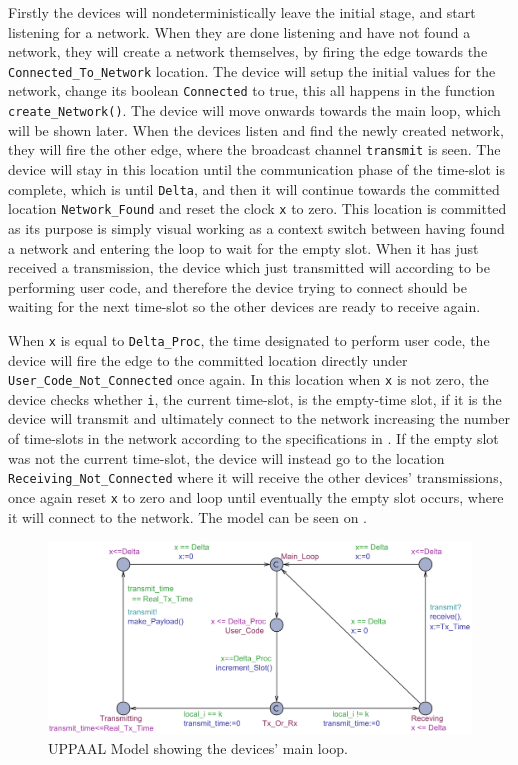 \newpage
\noindent
Firstly the devices will nondeterministically leave the initial stage, and start listening for a network.
When they are done listening and have not found a network, they will create a network themselves, by firing the edge towards the \texttt{Connected\_To\_Network} location.
The device will setup the initial values for the network, change its boolean \texttt{Connected} to true, this all happens in the function \texttt{create\_Network()}. 
The device will move onwards towards the main loop, which will be shown later.
When the devices listen and find the newly created network, they will fire the other edge, where the broadcast channel \texttt{transmit} is seen.
The device will stay in this location until the communication phase of the time-slot is complete, which is until \texttt{Delta}, and then it will continue towards the committed location \texttt{Network\_Found} and reset the clock \texttt{x} to zero.
This location is committed as its purpose is simply visual working as a context switch between having found a network and entering the loop to wait for the empty slot.
When it has just received a transmission, the device which just transmitted will according to  be performing user code, and therefore the device trying to connect should be waiting for the next time-slot so the other devices are ready to receive again.

\bigskip \noindent
When \texttt{x} is equal to \texttt{Delta\_Proc}, the time designated to perform user code, the device will fire the edge to the committed location directly under \texttt{User\_Code\_Not\_Connected} once again.
In this location when \texttt{x} is not zero, the device checks whether \texttt{i}, the current time-slot, is the empty-time slot, if it is the device will transmit and ultimately connect to the network increasing the number of time-slots in the network according to the specifications in .
If the empty slot was not the current time-slot, the device will instead go to the location \texttt{Receiving\_Not\_Connected} where it will receive the other devices' transmissions, once again reset \texttt{x} to zero and loop until eventually the empty slot occurs, where it will connect to the network.
The model can be seen on .

\begin{figure}
  \includegraphics[width=1\textwidth]{Figures/Model/Device_Connected.pdf} 
\caption{UPPAAL Model showing the devices' main loop.}
\label{fig:UPPAAL_Connected}
\end{figure}

